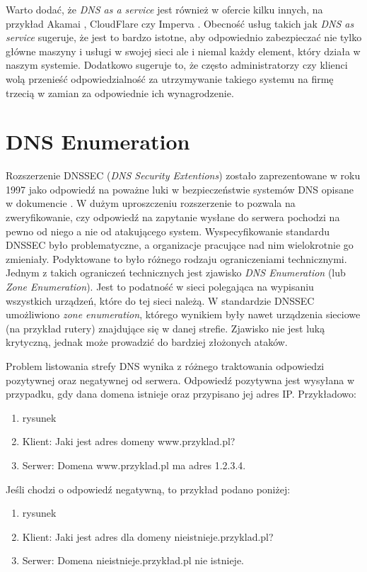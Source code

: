 Warto dodać, że \textit{DNS as a service} jest również w ofercie kilku innych, na przykład Akamai \cite{akamai},
CloudFlare \cite{cloudflare} czy Imperva \cite{incapsula}. Obecność usług takich jak \textit{DNS as service} sugeruje, że jest to bardzo
istotne, aby odpowiednio zabezpieczać nie tylko główne maszyny i usługi w swojej sieci ale i niemal każdy element, który działa
w naszym systemie. Dodatkowo sugeruje to, że często administratorzy czy klienci wolą przenieść odpowiedzialność za utrzymywanie
takiego systemu na firmę trzecią w zamian za odpowiednie ich wynagrodzenie.

\section{DNS Enumeration}\label{zone_enumeration}
Rozszerzenie DNSSEC (\textit{DNS Security Extentions}) zostało zaprezentowane w roku 1997 \cite{RFC2065} jako odpowiedź na poważne
luki w bezpieczeństwie systemów DNS opisane w dokumencie \cite{DNSsecurityProblem}. W dużym uproszczeniu rozszerzenie to pozwala
na zweryfikowanie, czy odpowiedź na zapytanie wysłane do serwera pochodzi na pewno od niego a nie od atakującego system.
Wyspecyfikowanie standardu DNSSEC było problematyczne, a organizacje pracujące nad nim wielokrotnie go zmieniały. Podyktowane to
było różnego rodzaju ograniczeniami technicznymi. Jednym z takich ograniczeń technicznych jest zjawisko \textit{DNS Enumeration}
(lub \textit{Zone Enumeration}). Jest to podatność w sieci polegająca na wypisaniu wszystkich urządzeń, które do tej sieci należą.
W standardzie DNSSEC umożliwiono \textit{zone enumeration}, którego wynikiem były nawet urządzenia sieciowe (na przykład rutery)
znajdujące się w danej strefie. Zjawisko nie jest luką krytyczną, jednak może prowadzić do bardziej złożonych ataków.

Problem listowania strefy DNS wynika z różnego traktowania odpowiedzi pozytywnej oraz negatywnej od serwera. Odpowiedź pozytywna
jest wysyłana w przypadku, gdy dana domena istnieje oraz przypisano jej adres IP. Przykładowo:
\begin{enumerate}
	\item rysunek
	\item Klient: Jaki jest adres domeny www.przyklad.pl?
	\item Serwer: Domena www.przyklad.pl ma adres 1.2.3.4.
\end{enumerate}
Jeśli chodzi o odpowiedź negatywną, to przykład podano poniżej:
\begin{enumerate}
	\item rysunek
	\item Klient: Jaki jest adres dla domeny nieistnieje.przyklad.pl?
	\item Serwer: Domena nieistnieje.przykład.pl nie istnieje.
\end{enumerate}

